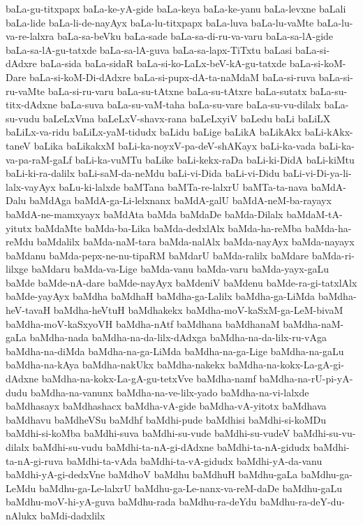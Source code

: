 {baLa-gu-titxpapx
baLa-ke-yA-gide
baLa-keya
baLa-ke-yanu
baLa-levxne
baLali
baLa-lide
baLa-li-de-nayAyx
baLa-lu-titxpapx
baLa-luva
baLa-lu-vaMte
baLa-lu-va-re-lalxra
baLa-sa-beVku
baLa-sade
baLa-sa-di-ru-va-varu
baLa-sa-lA-gide
baLa-sa-lA-gu-tatxde
baLa-sa-lA-guva
baLa-sa-lapx-TiTxtu
baLasi
baLa-si-dAdxre
baLa-sida
baLa-sidaR
baLa-si-ko-LaLx-beV-kA-gu-tatxde
baLa-si-koM-Dare
baLa-si-koM-Di-dAdxre
baLa-si-pupx-dA-ta-naMdaM
baLa-si-ruva
baLa-si-ru-vaMte
baLa-si-ru-varu
baLa-su-tAtxne
baLa-su-tAtxre
baLa-sutatx
baLa-su-titx-dAdxne
baLa-suva
baLa-su-vaM-taha
baLa-su-vare
baLa-su-vu-dilalx
baLa-su-vudu
baLeLxVma
baLeLxV-shavx-rana
baLeLxyiV
baLedu
baLi
baLiLX
baLiLx-va-ridu
baLiLx-yaM-tidudx
baLidu
baLige
baLikA
baLikAkx
baLi-kAkx-taneV
baLika
baLikakxM
baLi-ka-noyxV-pa-deV-shAKayx
baLi-ka-vada
baLi-ka-va-pa-raM-gaLf
baLi-ka-vuMTu
baLike
baLi-kekx-raDa
baLi-ki-DidA
baLi-kiMtu
baLi-ki-ra-dalilx
baLi-saM-da-neMdu
baLi-vi-Dida
baLi-vi-Didu
baLi-vi-Di-ya-li-lalx-vayAyx
baLu-ki-lalxde
baMTana
baMTa-re-lalxrU
baMTa-ta-nava
baMdA-Dalu
baMdAga
baMdA-ga-Li-lelxnanx
baMdA-galU
baMdA-neM-ba-rayayx
baMdA-ne-mamxyayx
baMdAta
baMda
baMdaDe
baMda-Dilalx
baMdaM-tA-yitutx
baMdaMte
baMda-ba-Lika
baMda-dedxlAlx
baMda-ha-reMba
baMda-ha-reMdu
baMdalilx
baMda-naM-tara
baMda-nalAlx
baMda-nayAyx
baMda-nayayx
baMdanu
baMda-pepx-ne-nu-tipaRM
baMdarU
baMda-ralilx
baMdare
baMda-ri-lilxge
baMdaru
baMda-va-Lige
baMda-vanu
baMda-varu
baMda-yayx-gaLu
baMde
baMde-nA-dare
baMde-nayAyx
baMdeniV
baMdenu
baMde-ra-gi-tatxlAlx
baMde-yayAyx
baMdha
baMdhaH
baMdha-ga-Lalilx
baMdha-ga-LiMda
baMdha-heV-tavaH
baMdha-heVtuH
baMdhakekx
baMdha-moV-kaSxM-ga-LeM-bivaM
baMdha-moV-kaSxyoVH
baMdha-nAtf
baMdhana
baMdhanaM
baMdha-naM-gaLa
baMdha-nada
baMdha-na-da-lilx-dAdxga
baMdha-na-da-lilx-ru-vAga
baMdha-na-diMda
baMdha-na-ga-LiMda
baMdha-na-ga-Lige
baMdha-na-gaLu
baMdha-na-kAya
baMdha-nakUkx
baMdha-nakekx
baMdha-na-kokx-La-gA-gi-dAdxne
baMdha-na-kokx-La-gA-gu-tetxVve
baMdha-namf
baMdha-na-rU-pi-yA-dudu
baMdha-na-vanunx
baMdha-na-ve-lilx-yado
baMdha-na-vi-lalxde
baMdhasayx
baMdhashacx
baMdha-vA-gide
baMdha-vA-yitotx
baMdhava
baMdhavu
baMdheVSu
baMdhf
baMdhi-pude
baMdhisi
baMdhi-si-koMDu
baMdhi-si-koMba
baMdhi-suva
baMdhi-su-vude
baMdhi-su-vudeV
baMdhi-su-vu-dilalx
baMdhi-su-vudu
baMdhi-ta-nA-gi-dAdxne
baMdhi-ta-nA-gidudx
baMdhi-ta-nA-gi-ruva
baMdhi-ta-vAda
baMdhi-ta-vA-gidudx
baMdhi-yA-da-vanu
baMdhi-yA-gi-dedxVne
baMdhoV
baMdhu
baMdhuH
baMdhu-gaLa
baMdhu-ga-LeMdu
baMdhu-ga-Le-lalxrU
baMdhu-ga-Le-nanx-va-reM-daDe
baMdhu-gaLu
baMdhu-moV-hi-yA-guva
baMdhu-rada
baMdhu-ra-deYdu
baMdhu-ra-deY-du-nAlukx
baMdi-dadxlilx
}
